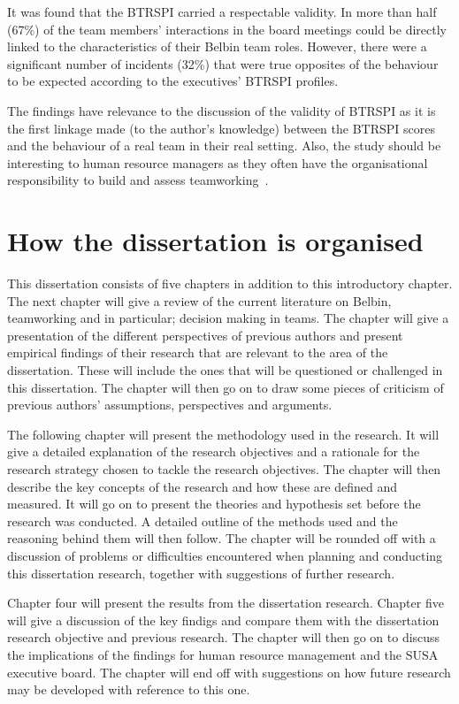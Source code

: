 \documentclass[a4paper,12pt,titlepage]{report}
\begin{document}
  It was found that the BTRSPI carried a respectable validity. In more
  than half (67\%) of the team members' interactions in the board
  meetings could be directly linked to the characteristics of
  their Belbin team roles. However, there were a significant
  number of incidents (32\%) that were true opposites of the behaviour to be expected
  according to the executives' BTRSPI profiles.

  The findings have relevance to the discussion of the validity of BTRSPI as it
  is the first linkage made (to the author's knowledge)
  between the BTRSPI scores and the behaviour of a
  real team in their real setting. Also, the study should be interesting to human
  resource managers as they often have the organisational responsibility to build
  and assess teamworking~\citep{fzje}.

  \section{How the dissertation is organised}
  This dissertation consists of five chapters in addition to this
  introductory chapter. The next chapter will give a  review of
  the current literature on Belbin, teamworking and in particular;
  decision making in teams. The chapter will give a presentation
  of the different perspectives of previous authors and present
  empirical findings of their research that are relevant to the area of the
  dissertation. These will include the ones that will be questioned or
  challenged in this dissertation. The chapter will then go on to
  draw some pieces of criticism of previous authors' assumptions,
  perspectives and arguments.
  
  The following chapter will present the methodology used in the
  research. It will give a detailed explanation of the research objectives
  and a rationale for the research strategy chosen to tackle the research
  objectives. The chapter will then describe the key concepts of
  the research and how these are defined and measured. It will go on to
  present the theories and hypothesis set before the 
  research was conducted. A detailed outline of the methods used
  and the reasoning behind them will then follow. The chapter will
  be rounded off with a discussion of problems or difficulties
  encountered when planning and conducting this dissertation
  research, together with suggestions of further research.

  Chapter four will present the results from the dissertation research.
  Chapter five will give a discussion of the key findigs and compare them
  with the dissertation research objective and previous research. The
  chapter will then go on to discuss the implications of the findings
  for human resource management and the SUSA executive board.
  The chapter will end off with suggestions on
  how future research may be developed with reference to this one.
\end{document}
